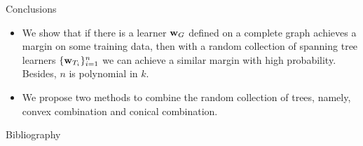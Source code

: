 \documentclass[first=dgreen,second=purple,logo=yellowexc]{aaltoslides}
\begin{document}
%
\begin{frame}{Conclusions}
	\begin{itemize}\footnotesize
		\item We show that if there is a learner $\mathbf {w}_G$ defined on a complete graph achieves a margin on some training data, then with a random collection of spanning tree learners $\{\mathbf {w}_{T_i}\}_{i=1}^n$ we can achieve a similar margin with high probability. Besides, $n$ is polynomial in $k$.
		\item We propose two methods to combine the random collection of trees, namely, convex combination and conical combination.
	\end{itemize}
\end{frame}




\begin{frame}[allowframebreaks]{Bibliography}
%

 
\end{frame}
\end{document}
